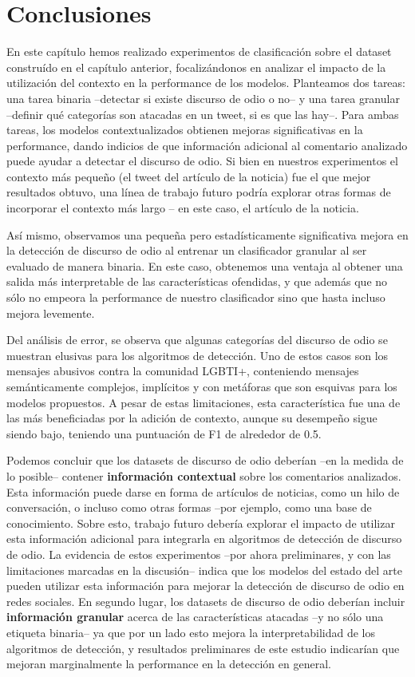 \section{Conclusiones}

En este capítulo hemos realizado experimentos de clasificación sobre el dataset construído en el capítulo anterior, focalizándonos en analizar el impacto de la utilización del contexto en la performance de los modelos. Planteamos dos tareas: una tarea binaria --detectar si existe discurso de odio o no-- y una tarea granular --definir qué categorías son atacadas en un tweet, si es que las hay--. Para ambas tareas, los modelos contextualizados obtienen mejoras significativas en la performance, dando indicios de que información adicional al comentario analizado puede ayudar a detectar el discurso de odio. Si bien en nuestros experimentos el contexto más pequeño (el tweet del artículo de la noticia) fue el que mejor resultados obtuvo, una línea de trabajo futuro podría explorar otras formas de incorporar el contexto más largo -- en este caso, el artículo de la noticia.

Así mismo, observamos una pequeña pero estadísticamente significativa mejora en la detección de discurso de odio al entrenar un clasificador granular al ser evaluado de manera binaria. En este caso, obtenemos una ventaja al obtener una salida más interpretable de las características ofendidas, y que además que no sólo no empeora la performance de nuestro clasificador sino que hasta incluso mejora levemente.

Del análisis de error, se observa que algunas categorías del discurso de odio se muestran elusivas para los algoritmos de detección. Uno de estos casos son los mensajes abusivos contra la comunidad LGBTI+, conteniendo mensajes semánticamente complejos, implícitos y con metáforas que son esquivas para los modelos propuestos. A pesar de estas limitaciones, esta característica fue una de las más beneficiadas por la adición de contexto, aunque su desempeño sigue siendo bajo, teniendo una puntuación de F1 de alrededor de 0.5.

Podemos concluir que los datasets de discurso de odio deberían --en la medida de lo posible-- contener \textbf{información contextual} sobre los comentarios analizados. Esta información puede darse en forma de artículos de noticias, como un hilo de conversación, o incluso como otras formas --por ejemplo, como una base de conocimiento. Sobre esto, trabajo futuro debería explorar el impacto de utilizar esta información adicional para integrarla en algoritmos de detección de discurso de odio. La evidencia de estos experimentos --por ahora preliminares, y con las limitaciones marcadas en la discusión-- indica que los modelos del estado del arte pueden utilizar esta información para mejorar la detección de discurso de odio en redes sociales. En segundo lugar, los datasets de discurso de odio deberían incluir \textbf{información granular} acerca de las características atacadas --y no sólo una etiqueta binaria-- ya que por un lado esto mejora la interpretabilidad de los algoritmos de detección, y resultados preliminares de este estudio indicarían que mejoran marginalmente la performance en la detección en general.

